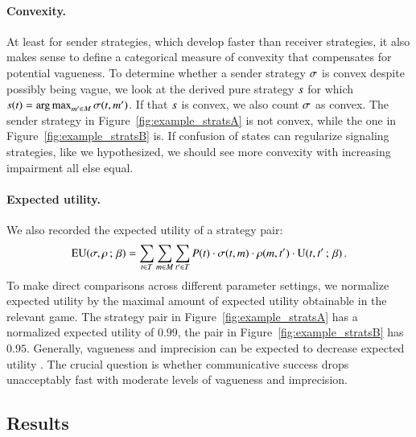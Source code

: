 \documentclass[fleqn,reqno,10pt]{article}
\newcommand{\toler}{\ensuremath{\beta}} %
\renewcommand{\Pr}{\ensuremath{P}}
\begin{document}
\paragraph{Convexity.} At least for sender strategies, which develop faster than receiver
strategies, it also makes sense to define a categorical measure of convexity that compensates
for potential vagueness. To determine whether a sender strategy $\sigma$ is convex despite
possibly being vague, we look at the derived pure strategy $s$ for which
$s(t) = \operatorname*{arg\,max}_{m' \in M} \sigma(t,m')$. If that $s$ is
convex, we also count $\sigma$ as convex. The sender strategy in
Figure~\ref{fig:example_stratsA} is not convex, while the one in
Figure~\ref{fig:example_stratsB} is.  If confusion of states can regularize signaling
strategies, like we hypothesized, we should see more convexity with increasing impairment all
else equal.

\paragraph{Expected utility.} We also recorded the expected utility of
a strategy pair:
\begin{align*}
  \EU(\Sstrat,\Rstrat \myts ; \myts \toler) = \sum_{\state \in
    \States} \sum_{\messg \in \Messgs} \sum_{\state' \in \States}
  \Pr(\state) \cdot \Sstrat(\state, \messg) \cdot \Rstrat(\messg,
  \state') \cdot \Util(\state,\state' \myts ; \myts \toler)\,.
\end{align*}
To make direct comparisons across different parameter settings, we
normalize expected utility by the maximal amount of expected utility
obtainable in the relevant game. The strategy pair in
Figure~\ref{fig:example_stratsA} has a normalized expected utility of
$0.99$, the pair in Figure~\ref{fig:example_stratsB} has
$0.95$. Generally, vagueness and imprecision can be expected to
decrease expected utility
\citep[c.f.][]{Lipman2009:Why-is-Language}. The crucial question is
whether communicative success drops unacceptably fast with moderate
levels of vagueness and imprecision.

\subsection{Results}
\end{document}
